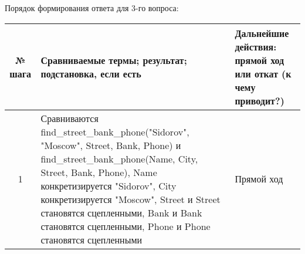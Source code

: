 \documentclass[a4paper,12pt]{article}
\begin{document}
	Порядок формирования ответа для 3-го вопроса:
	\begin{table}[ht!] 
		\begin{tabularx}{\linewidth}{|c|>{\centering}X|>{\centering}X|}
			\hline
			№ шага & Сравниваемые термы; результат; подстановка, если есть & Дальнейшие действия: прямой ход или откат (к чему приводит?)\tabularnewline
			\hline
			1 & Сравниваются find\_street\_bank\_phone("Sidorov"{}, "Moscow"{}, Street, Bank, Phone) и find\_street\_bank\_phone(Name, City, Street, Bank, Phone), Name конкретизируется "Sidorov"{}, City конкретизируется "Moscow"{}, Street и Street становятся сцепленными, Bank и Bank становятся сцепленными, Phone и Phone становятся сцепленными & Прямой ход \tabularnewline
			\hline
		\end{tabularx}
	\end{table}
	\newpage
\end{document}
